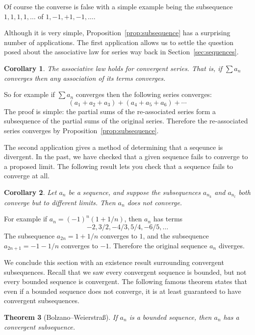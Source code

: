 \documentclass[11pt,oneside]{amsbook}
\theoremstyle{definition}
\theoremstyle{plain}
\newtheorem{thm}{Theorem}[section]
\newtheorem{cor}[thm]{Corollary}
\theoremstyle{definition}
\theoremstyle{remark}
\numberwithin{equation}{section}
\numberwithin{figure}{section}
\begin{document}
Of course the converse is false with a simple example being the subsequence $1,1,1,1,\ldots$ of $1,-1,+1,-1,\ldots$.

Although it is very simple, Proposition~\ref{prop:subsequence} has a surprising number of applications. The first application allows us to settle the question posed about the associative law for series way back in Section~\ref{sec:sequences}.

\begin{cor}
  The associative law holds for convergent series. That is, if $\sum a_n$ converges then any association of its terms converges.
\end{cor}

So for example if $\sum a_n$ converges then the following series converges:
\[(a_1+a_2+a_3)+(a_4+a_5+a_6)+\cdots
\]
The proof is simple: the partial sums of the re-associated series form a subsequence of the partial sums of the original series. Therefore the re-associated series converges by Proposition~\ref{prop:subsequence}.

The second application gives a method of determining that a seqeunce is divergent. In the past, we have checked that a given sequence fails to converge to a proposed limit. The following result lets you check that a sequence fails to converge at all.

\begin{cor}
  \label{cor:divergence}
  Let $a_n$ be a sequence, and suppose the subsequences $a_{n_k}$ and $a_{n_l}$ both converge but to different limits. Then $a_n$ does not converge.
\end{cor}

For example if $a_n=(-1)^n(1+1/n)$, then $a_n$ has terms
\[-2,3/2,-4/3,5/4,-6/5,\ldots
\]
The subsequence $a_{2n}=1+1/n$ converges to $1$, and the subsequence $a_{2n+1}=-1-1/n$ converges to $-1$. Therefore the original sequence $a_n$ diverges.

We conclude this section with an existence result surrounding convergent subsequences. Recall that we saw every convergent sequence is bounded, but not every bounded sequence is convergent. The following famous theorem states that even if a bounded sequence does not converge, it is at least guaranteed to  have convergent subsequences.

\begin{thm}[Bolzano--Weierstra\ss]
  If $a_n$ is a bounded sequence, then $a_n$ has a convergent subsequence.
\end{thm}
\end{document}

